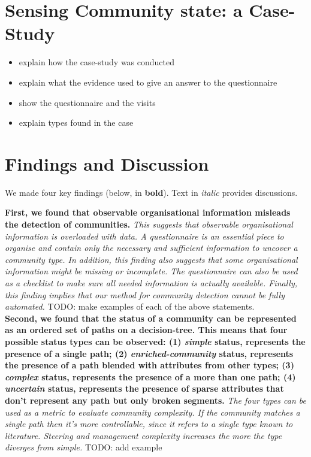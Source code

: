 \documentclass[conference]{IEEEtran}
\begin{document}

\section{Sensing Community state: a Case-Study}\label{cs}
\begin{itemize}
\item explain how the case-study was conducted
\item explain what the evidence used to give an answer to the questionnaire
\item show the questionnaire and the visits
\item explain types found in the case
\end{itemize}

\section{Findings and Discussion}\label{res}

We made four key findings (below, in {\bf bold}). Text in \emph{italic} provides discussions.

{\bf First, we found that observable organisational information misleads the detection of communities.}
%
\emph{This suggests that observable organisational information is overloaded with data. A questionnaire is an essential piece to organise and contain only the necessary and sufficient information to uncover a community type. In addition, this finding also suggests that some organisational information might be missing or incomplete. The questionnaire can also be used as a checklist to make sure all needed information is actually available. Finally, this finding implies that our method for community detection cannot be fully automated.}
TODO: make examples of each of the above statements.\\

{\bf Second, we found that the status of a community can be represented as an ordered set of paths on a decision-tree. This means that  four possible status types can be observed: (1) \emph{simple} status, represents the presence of a single path; (2) \emph{enriched-community} status, represents the presence of a path blended with attributes from other types; (3) \emph{complex} status, represents the presence of a more than one path; (4) \emph{uncertain} status, represents the presence of sparse attributes that don't represent any path but only broken segments.}
\emph{The four types can be used as a metric to evaluate community complexity. If the community matches a single path then it's more controllable, since it refers to a single type known to literature. Steering and management complexity increases the more the type diverges from simple.}
TODO: add example\\
\end{document}
